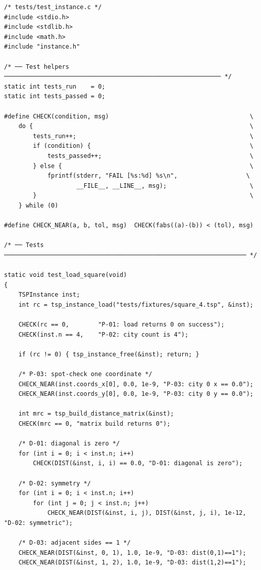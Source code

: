 \documentclass[11pt]{article}
\begin{document}
\begin{lstlisting}[style=cstyle]
/* tests/test_instance.c */
#include <stdio.h>
#include <stdlib.h>
#include <math.h>
#include "instance.h"

/* ── Test helpers ──────────────────────────────────────────────────────────── */
static int tests_run    = 0;
static int tests_passed = 0;

#define CHECK(condition, msg)                                       \
    do {                                                            \
        tests_run++;                                                \
        if (condition) {                                            \
            tests_passed++;                                         \
        } else {                                                    \
            fprintf(stderr, "FAIL [%s:%d] %s\n",                   \
                    __FILE__, __LINE__, msg);                       \
        }                                                           \
    } while (0)

#define CHECK_NEAR(a, b, tol, msg)  CHECK(fabs((a)-(b)) < (tol), msg)

/* ── Tests ─────────────────────────────────────────────────────────────────── */

static void test_load_square(void)
{
    TSPInstance inst;
    int rc = tsp_instance_load("tests/fixtures/square_4.tsp", &inst);

    CHECK(rc == 0,        "P-01: load returns 0 on success");
    CHECK(inst.n == 4,    "P-02: city count is 4");

    if (rc != 0) { tsp_instance_free(&inst); return; }

    /* P-03: spot-check one coordinate */
    CHECK_NEAR(inst.coords_x[0], 0.0, 1e-9, "P-03: city 0 x == 0.0");
    CHECK_NEAR(inst.coords_y[0], 0.0, 1e-9, "P-03: city 0 y == 0.0");

    int mrc = tsp_build_distance_matrix(&inst);
    CHECK(mrc == 0, "matrix build returns 0");

    /* D-01: diagonal is zero */
    for (int i = 0; i < inst.n; i++)
        CHECK(DIST(&inst, i, i) == 0.0, "D-01: diagonal is zero");

    /* D-02: symmetry */
    for (int i = 0; i < inst.n; i++)
        for (int j = 0; j < inst.n; j++)
            CHECK_NEAR(DIST(&inst, i, j), DIST(&inst, j, i), 1e-12, "D-02: symmetric");

    /* D-03: adjacent sides == 1 */
    CHECK_NEAR(DIST(&inst, 0, 1), 1.0, 1e-9, "D-03: dist(0,1)==1");
    CHECK_NEAR(DIST(&inst, 1, 2), 1.0, 1e-9, "D-03: dist(1,2)==1");


\end{lstlisting}
\end{document}
